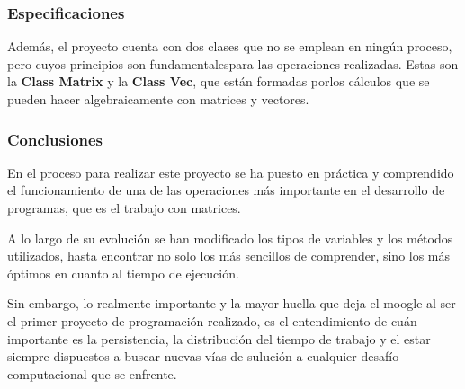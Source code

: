 \documentclass{beamer}
\begin{document}
\begin{frame}
    \frametitle{Especificaciones}
    Además, el proyecto cuenta con dos clases que no se emplean en ningún proceso, pero cuyos principios son 
    fundamentalespara las operaciones realizadas. Estas son la \textbf{Class Matrix} y  la \textbf{Class Vec},  que 
    están formadas porlos cálculos que se pueden hacer algebraicamente con matrices y vectores.
\end{frame}

\begin{frame}
    \frametitle{Conclusiones}
    En el proceso para realizar este proyecto se ha puesto en práctica y comprendido el funcionamiento de una de las 
    operaciones más importante en el desarrollo de programas, que es el trabajo con matrices. 
    
    A lo largo de su evolución se han modificado los tipos de variables y los métodos utilizados, hasta encontrar no 
    solo los más sencillos de comprender, sino los más óptimos en cuanto al tiempo de ejecución.

    Sin embargo, lo realmente importante y la mayor huella que deja el moogle al ser el primer proyecto de programación 
    realizado, es el entendimiento de cuán importante es la persistencia, la distribución del tiempo de trabajo y el 
    estar siempre dispuestos a buscar nuevas vías de sulución a cualquier desafío computacional que se enfrente.
\end{frame}
\end{document}
